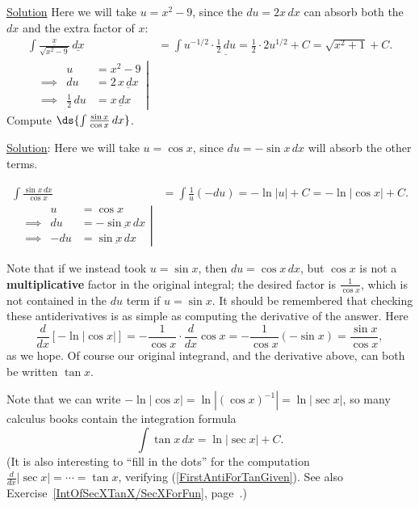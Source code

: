 \underline{Solution} Here we will take $u=x^2-9$, since the $du=2x\,dx$
can absorb both the $dx$ and the extra factor of $x$:
\begin{align*}
\int\frac{\underline{x}}
  {\sqrt{x^2-9}}\,\underline{dx}&=\int u^{-1/2}\cdot\underline{\frac12\,du}
 =\frac12\cdot2{u}^{1/2}+C=\sqrt{x^2+1}+C.  \\
\left.\begin{alignedat}{2}&&u&=x^2-9\\ &\implies&du&=2\,\underline{x\,dx}\\
       &\implies&\frac12\,du&=\underline{x\,dx}\end{alignedat}\right|&
\end{align*}
\eex
\bex Compute $\ds{\int\frac{\sin x}{\cos x}\,dx}$.

\underline{Solution}:  Here we will take $u=\cos x$, since
$du=-\sin x\,dx$ will absorb the other terms.  

\begin{align*}
\int\frac{{\sin x}\,dx}{\cos x}
 &=\int\frac1{u}(-du)=-\ln|u|+C=-\ln|\cos x|+C.\\
\left.\begin{alignedat}{2}
&&u&=\cos x\\
&\implies&du&=-\underline{\sin x\,dx}\\
&\implies&-du&=\underline{\sin x\,dx}\end{alignedat}\right|&
\end{align*}


Note that
if we instead took $u=\sin x$, then $du=\cos x\,dx$, but $\cos x$ is not
a {\bf multiplicative} factor in the original integral; the desired factor is 
$\frac1{\cos x}$, which is not contained in the $du$ term
if $u=\sin x$.
\eex
It should be remembered that checking these antiderivatives is as
simple as computing the derivative of the answer.  Here
$$\frac{d}{dx}\left[-\ln|\cos x|\right]=
   -\frac{1}{\cos x}\cdot\frac{d}{dx}\cos x
   =-\frac{1}{\cos x}(-\sin x)=\frac{\sin x}{\cos x},$$
as we hope. Of course our original integrand, and the
derivative above, can both be written $\tan x$.

 Note that we can write
$-\ln|\cos x|=\ln\left|(\cos x)^{-1}\right|=\ln|\sec x|$,
so many calculus books contain the integration formula
\begin{equation}\int\tan x\,dx=\ln|\sec x|+C.\label{FirstAntiForTanGiven}
\end{equation}
(It is also interesting to ``fill in the dots''
for the computation $\frac{d}{dx}|\sec x|=\cdots=\tan x$,
verifying (\ref{FirstAntiForTanGiven}).
See also Exercise~\ref{IntOfSecXTanX/SecXForFun}, 
page~\pageref{IntOfSecXTanX/SecXForFun}.)

